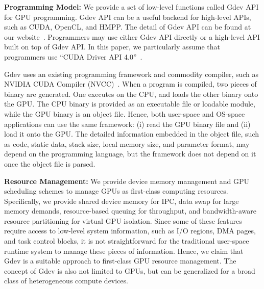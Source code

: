 \textbf{Programming Model:}
We provide a set of low-level functions called Gdev API for GPU
programming.
Gdev API can be a useful backend for high-level APIs, such as CUDA,
OpenCL, and HMPP.
The detail of Gdev API can be found at our website~\cite{Gdev}.
Programmers may use either Gdev API directly or a high-level API built
on top of Gdev API.
In this paper, we particularly assume that programmers use ``CUDA Driver
API 4.0''~\cite{CUDA40}.

Gdev uses an existing programming framework and commodity compiler, such
as NVIDIA CUDA Compiler (NVCC)~\cite{CUDA40}.
When a program is compiled, two pieces of binary are generated.
One executes on the CPU, and loads the other binary onto the GPU.
The CPU binary is provided as an executable file or loadable module,
while the GPU binary is an object file.
Hence, both user-space and OS-space applications can use the same
framework: (i) read the GPU binary file and (ii) load it onto the GPU.
The detailed information embedded in the object file, such as code,
static data, stack size, local memory size, and parameter format, may
depend on the programming language, but the framework does not depend on
it once the object file is parsed.

\textbf{Resource Management:}
We provide device memory management and GPU scheduling schemes to manage
GPUs as first-class computing resources.
Specifically, we provide shared device memory for IPC, data swap for
large memory demands, resource-based queuing for throughput, and
bandwidth-aware resource partitioning for virtual GPU isolation.
Since some of these features require access to low-level system
information, such as I/O regions, DMA pages, and task control blocks, it
is not straightforward for the traditional user-space runtime system to
manage these pieces of information.
Hence, we claim that Gdev is a suitable approach to first-class GPU
resource management.
The concept of Gdev is also not limited to GPUs, but can be
generalized for a broad class of heterogeneous compute devices.


